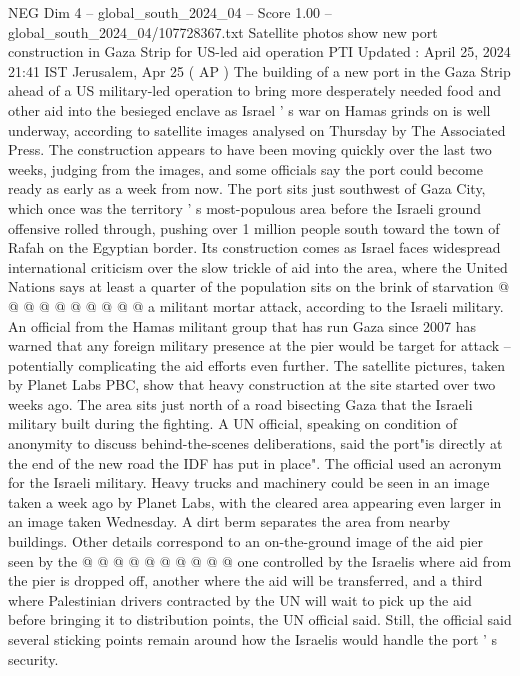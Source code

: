 \begin{textsample}{NEG Dim 4 – global\_south\_2024\_04 – Score 1.00 – global\_south\_2024\_04/107728367.txt}  \label{ex:f4_neg_199}
Satellite photos show new port construction in Gaza Strip for US-led aid operation PTI Updated : April 25, 2024 21:41 IST Jerusalem, Apr 25 ( AP ) The building of a new port in the Gaza Strip ahead of a US military-led operation to bring more desperately needed food and other aid into the besieged enclave as Israel ' s war on Hamas grinds on is well underway, according to satellite images analysed on Thursday by The Associated Press.
The construction appears to have been moving quickly over the last two weeks, judging from the images, and some officials say the port could become ready as early as a week from now.
The port sits just southwest of Gaza City, which once was the territory ' s most-populous area before the Israeli ground offensive rolled through, pushing over 1 million people south toward the town of Rafah on the Egyptian border.
Its construction comes as Israel faces widespread international criticism over the slow trickle of aid into the area, where the United Nations says at least a quarter of the population sits on the brink of starvation @ @ @ @ @ @ @ @ @ @ a militant mortar attack, according to the Israeli military.
An official from the Hamas militant group that has run Gaza since 2007 has warned that any foreign military presence at the pier would be target for attack -- potentially complicating the aid efforts even further.
The satellite pictures, taken by Planet Labs PBC, show that heavy construction at the site started over two weeks ago.
The area sits just north of a road bisecting Gaza that the Israeli military built during the fighting.
A UN official, speaking on condition of anonymity to discuss behind-the-scenes deliberations, said the port"is directly at the end of the new road the IDF has put in place".
The official used an acronym for the Israeli military.
Heavy trucks and machinery could be seen in an image taken a week ago by Planet Labs, with the cleared area appearing even larger in an image taken Wednesday.
A dirt berm separates the area from nearby buildings.
Other details correspond to an on-the-ground image of the aid pier seen by the @ @ @ @ @ @ @ @ @ @ one controlled by the Israelis where aid from the pier is dropped off, another where the aid will be transferred, and a third where Palestinian drivers contracted by the UN will wait to pick up the aid before bringing it to distribution points, the UN official said.
Still, the official said several sticking points remain around how the Israelis would handle the port ' s security.

\end{textsample}
